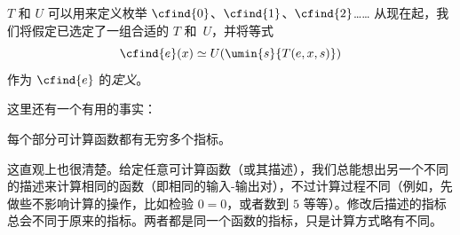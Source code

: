 \documentclass[../../../include/open-logic-section]{subfiles}
\begin{document}
$T$ 和 $U$ 可以用来定义枚举 $\cfind{0}$、$\cfind{1}$、$\cfind{2}$…… 从现在起，我们将假定已选定了一组合适的 $T$ 和~$U$，并将等式 \[
\cfind{e}(x) \simeq U(\umin{s}{T(e,x,s)})
\]
作为 $\cfind{e}$ 的\emph{定义}。

这里还有一个有用的事实：

\begin{thm}
每个部分可计算函数都有无穷多个指标。
\end{thm}

这直观上也很清楚。给定任意可计算函数（或其描述），我们总能想出另一个不同的描述来计算相同的函数（即相同的输入-输出对），不过计算过程不同（例如，先做些不影响计算的操作，比如检验 $0 = 0$，或者数到 $5$ 等等）。修改后描述的指标总会不同于原来的指标。两者都是同一个函数的指标，只是计算方式略有不同。
\end{document}
